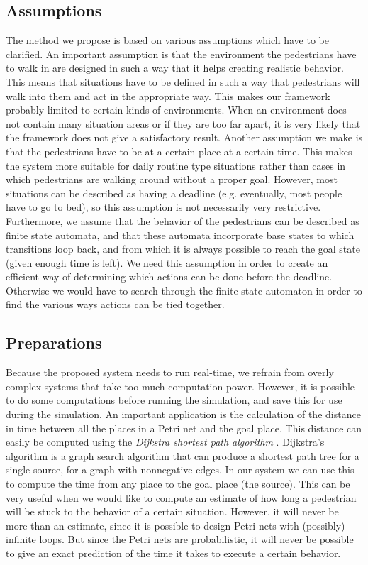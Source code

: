 \documentclass[11pt]{book}
\begin{document}
\subsection{Assumptions}
The method we propose is based on various assumptions which have to be clarified. An important assumption is that the environment the pedestrians have to walk in are designed in such a way that it helps creating realistic behavior. This means that situations have to be defined in such a way that pedestrians will walk into them and act in the appropriate way. This makes our framework probably limited to certain kinds of environments. When an environment does not contain many situation areas or if they are too far apart, it is very likely that the framework does not give a satisfactory result.
Another assumption we make is that the pedestrians have to be at a certain place at a certain time. This makes the system more suitable for daily routine type situations rather than cases in which pedestrians are walking around without a proper goal. However, most situations can be described as having a deadline (e.g. eventually, most people have to go to bed), so this assumption is not necessarily very restrictive.\\
Furthermore, we assume that the behavior of the pedestrians can be described as finite state automata,  and that these automata incorporate base states to which transitions loop back, and from which it is always possible to reach the goal state (given enough time is left). We need this assumption in order to create an efficient way of determining which actions can be done before the deadline. Otherwise we would have to search through the finite state automaton in order to find the various ways actions can be tied together.\\

\subsection{Preparations}
Because the proposed system needs to run real-time, we refrain from overly complex systems that take too much computation power.
However, it is possible to do some computations before running the simulation, and save this for use during the simulation. An important application is the calculation of the distance in time between all the places in a Petri net and the goal place. This distance can easily be computed using the \emph{Dijkstra shortest path algorithm} \cite{dijkstra}. Dijkstra's algorithm is a graph search algorithm that can produce a shortest path tree for a single source, for a graph with nonnegative edges. In our system we can use this to compute the time from any place to the goal place (the source). This can be very useful when we would like to compute an estimate of how long a pedestrian will be stuck to the behavior of a certain situation. However, it will never be more than an estimate, since it is possible to design Petri nets with (possibly) infinite loops. But since the Petri nets are probabilistic, it will never be possible to give an exact prediction of the time it takes to execute a certain behavior.
\end{document}
